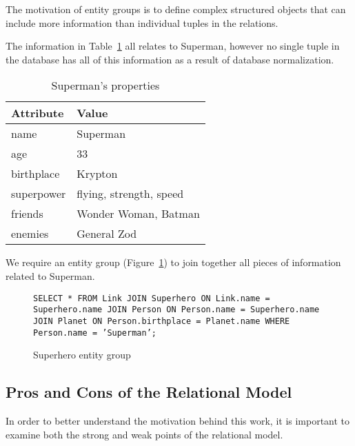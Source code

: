 		The motivation of entity groups is to define complex structured objects that can include more information than individual tuples in the relations.
		
		\begin{ex}
			The information in Table~\ref{tbl:superman-properties} all relates to Superman, however no single tuple in the database has all of this information as a result of database normalization.
			
			\begin{table}[!ht]
				\centering
				
				\begin{tabular}{ll}
					\toprule
					Attribute & Value \\
					\midrule
					name & Superman \\
					age & 33 \\
					birthplace & Krypton \\
					superpower & flying, strength, speed \\
					friends & Wonder Woman, Batman \\
					enemies & General Zod \\
					\bottomrule
				\end{tabular}
				
				\caption{Superman's properties}
				\label{tbl:superman-properties}
			\end{table}
			
			We require an entity group (Figure~\ref{fig:superhero-entity-group}) to join together all pieces of information related to Superman.
			
			\begin{figure}[!ht]
				\texttt{SELECT * FROM Link JOIN Superhero ON Link.name = Superhero.name JOIN Person ON Person.name = Superhero.name JOIN Planet ON Person.birthplace = Planet.name WHERE Person.name = 'Superman';}
				
				\caption{Superhero entity group}
				\label{fig:superhero-entity-group}
			\end{figure}

		\end{ex}

	\subsection{Pros and Cons of the Relational Model}
		In order to better understand the motivation behind this work, it is important to examine both the strong and weak points of the relational model.
		
